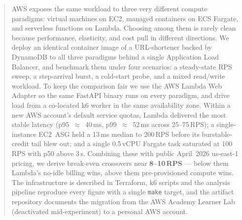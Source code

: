 \begin{abstract}
\noindent
AWS exposes the same workload to three very different compute paradigms:
virtual machines on EC2, managed containers on ECS Fargate, and serverless
functions on Lambda. Choosing among them is rarely clean because
performance, elasticity, and cost pull in different directions. We
deploy an identical container image of a URL-shortener backed by
DynamoDB to all three paradigms behind a single Application Load
Balancer, and benchmark them under four scenarios: a steady-state RPS
sweep, a step-arrival burst, a cold-start probe, and a mixed
read/write workload. To keep the comparison fair we use the AWS Lambda
Web Adapter so the same FastAPI binary runs on every paradigm, and
drive load from a co-located k6 worker in the same availability zone.
Within a new AWS account's default service quotas, Lambda delivered
the most stable latency (p95~$\approx$~40\,ms, p99~$\approx$~52\,ms across
25--75\,RPS); a single-instance EC2~ASG held a 13\,ms median to 200\,RPS
before its burstable-credit tail blew out; and a single 0.5\,vCPU
Fargate task saturated at 100\,RPS with p50 above 3\,s. Combining
these with public April~2026 us-east-1 pricing, we derive break-even
crossovers near \textbf{8--10\,RPS} --- below them Lambda's no-idle
billing wins, above them pre-provisioned compute wins. The infrastructure
is described in Terraform, k6 scripts and the analysis pipeline
reproduce every figure with a single \texttt{make} target, and the
artifact repository documents the migration from the AWS Academy
Learner Lab (deactivated mid-experiment) to a personal AWS account.
\end{abstract}
